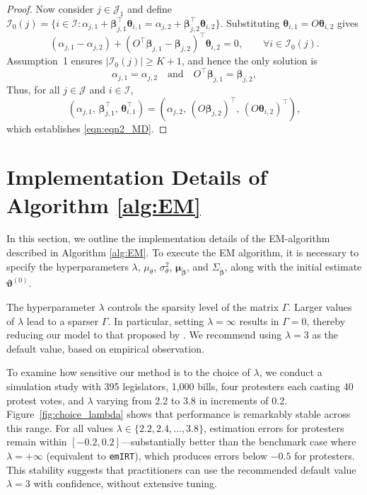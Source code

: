 \documentclass[11pt]{article}
\begin{document}
\begin{proof}
Now consider $j\in\mathcal{J}_1$ and define $\mathcal{I}_0(j) = \bigl\{i\in\mathcal{I} :\alpha_{j,1} + \boldsymbol{\beta}_{j,1}^\top\boldsymbol{\theta}_{i,1} = \alpha_{j,2} + \boldsymbol{\beta}_{j,2}^\top\boldsymbol{\theta}_{i,2} \bigr\}$.
Substituting $\boldsymbol{\theta}_{i,1}=O\boldsymbol{\theta}_{i,2}$ gives
\begin{equation*}
    (\alpha_{j,1}-\alpha_{j,2})
    +
    (O^\top\boldsymbol{\beta}_{j,1}-\boldsymbol{\beta}_{j,2})^\top\boldsymbol{\theta}_{i,2}
    =0,
    \qquad \forall i\in\mathcal{I}_0(j).
\end{equation*}
Assumption~1 ensures $|\mathcal{I}_0(j)|\ge K+1$, and hence the only solution is
\begin{equation*}
    \alpha_{j,1}=\alpha_{j,2}
    \quad\text{and}\quad
    O^\top\boldsymbol{\beta}_{j,1}=\boldsymbol{\beta}_{j,2},
\end{equation*}
Thus, for all $j\in\mathcal{J}$ and $i\in\mathcal{I}$,
\begin{equation*}
    (\alpha_{j,1},\,\boldsymbol{\beta}_{j,1}^\top,\,\boldsymbol{\theta}_{i,1}^\top)
    =
    (\alpha_{j,2},\,(O\boldsymbol{\beta}_{j,2})^\top,\,(O\boldsymbol{\theta}_{i,2})^\top),
\end{equation*}
which establishes \eqref{eqn:eqn2_MD}.
\end{proof}


\section{Implementation Details of Algorithm \ref{alg:EM}}\label{Appen_B}
In this section, we outline the implementation details of the EM-algorithm described in Algorithm \ref{alg:EM}. To execute the EM algorithm, it is necessary to specify the hyperparameters $\lambda$, $\mu_{\theta}$, $\sigma_\theta^2$, $\boldsymbol{\mu}_{\boldsymbol{\tilde{\beta}}}$, and $\Sigma_{\boldsymbol{\tilde{\beta}}}$, along with the initial estimate $\boldsymbol{\vartheta}^{(0)}$.

The hyperparameter $\lambda$ controls the sparsity level of the matrix $\Gamma$. Larger values of $\lambda$ lead to a sparser $\Gamma$. In particular, setting $\lambda = \infty$ results in $\Gamma = 0$, thereby reducing our model to that proposed by \cite{Imai2016}. We recommend using $\lambda = 3$ as the default value, based on empirical observation. 

To examine how sensitive our method is to the choice of $\lambda$, we conduct a simulation study with 395 legislators, 1{,}000 bills, four protesters each casting 40 protest votes, and $\lambda$ varying from 2.2 to 3.8 in increments of 0.2. Figure~\ref{fig:choice_lambda} shows that performance is remarkably stable across this range. For all values $\lambda \in \{2.2, 2.4, \ldots, 3.8\}$, estimation errors for protesters remain within $[-0.2, 0.2]$—substantially better than the benchmark case where $\lambda = +\infty$ (equivalent to \texttt{emIRT}), which produces errors below $-0.5$ for protesters. This stability suggests that practitioners can use the recommended default value $\lambda = 3$ with confidence, without extensive tuning.
\end{document}
